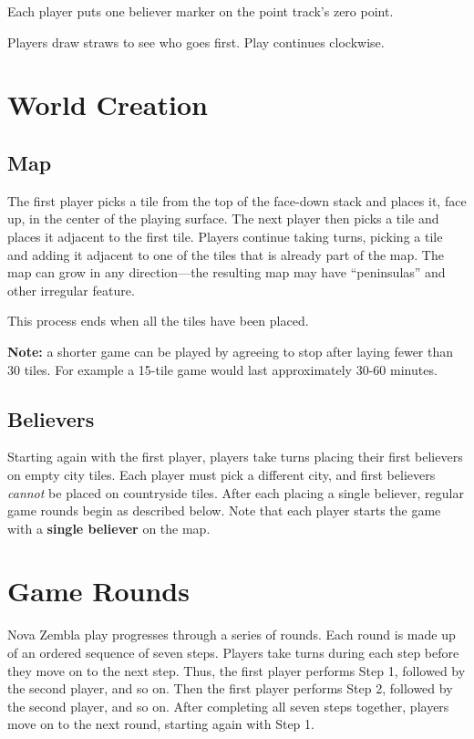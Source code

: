 Each player puts one believer marker on the point track's zero point.

Players draw straws to see who goes first.  Play continues clockwise. 



\section{World Creation}

\subsection{Map}
The first player picks a tile from the top of the face-down stack and places it, face up, in the center of the playing surface.  The next player then picks a tile and places it adjacent to the first tile.  Players continue taking turns, picking a tile and adding it adjacent to one of the tiles that is already part of the map.
The map can grow in any direction---the resulting map may have ``peninsulas'' and other irregular feature.


This process ends when all the tiles have been placed.

{\bf Note:}  a shorter game can be played by agreeing to stop after laying fewer than 30 tiles.
For example a 15-tile game would last approximately 30-60 minutes.

\subsection{Believers}
Starting again with the first player, players take turns placing their first believers on empty city tiles.
Each player must pick a different city, and first believers {\em cannot} be placed on countryside tiles.
After each placing a single believer, regular game rounds begin as described below.
Note that each player starts the game with a {\bf single believer} on the map.


\section{Game Rounds}

Nova Zembla play progresses through a series of rounds.
Each round is made up of an ordered sequence of seven steps.
Players take turns during each step before they move on to the next step.
Thus, the first player performs Step 1, followed by the second player, and so on.
Then the first player performs Step 2, followed by the second player, and so on.
After completing all seven steps together, players move on to the next round, starting again with Step 1.

